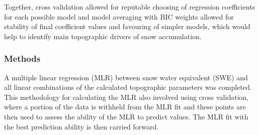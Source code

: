 \documentclass[12pt]{article}
\begin{document}
Together, cross validation allowed for reputable choosing of regression coefficients for each possible model and model averaging with BIC weights allowed for stability of final coefficient values and favouring of simpler models, which would help to identify main topographic drivers of snow accumulation. 

\subsubsection{Methods}
\label{sec:MLRMethods}

A multiple linear regression (MLR) between snow water equivalent (SWE) and all linear combinations of the calculated topographic parameters was completed. This methodology for calculating the MLR also involved using cross validation, where a portion of the data is withheld from the MLR fit and these points are then used to assess the ability of the MLR to predict values. The MLR fit with the best prediction ability is then carried forward. 
\end{document}
